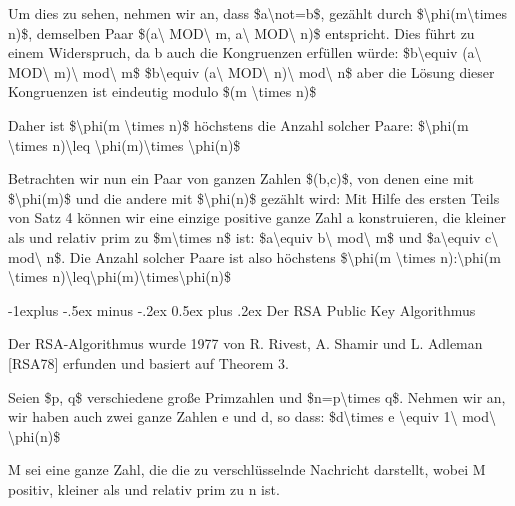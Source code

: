 \documentclass[a4paper]{article}
\makeatletter
\renewcommand{\subsection}{\@startsection{subsection}{2}{0mm}%
 {-1explus -.5ex minus -.2ex}%
 {0.5ex plus .2ex}%
 {\normalfont\normalsize\bfseries}}
\makeatother
\begin{document}
\begin{multicols}{3}
\begin{itemize*}
\begin{itemize*}
\begin{itemize*}
                        \begin{itemize*} \item Um dies zu sehen, nehmen wir an, dass \$a\textbackslash not=b\$, gezählt durch \$\textbackslash phi(m\textbackslash times n)\$, demselben Paar \$(a\textbackslash{} MOD\textbackslash{} m, a\textbackslash{} MOD\textbackslash{} n)\$ entspricht. Dies führt zu einem Widerspruch, da b auch die Kongruenzen erfüllen würde: \$b\textbackslash equiv (a\textbackslash{} MOD\textbackslash{} m)\textbackslash{} mod\textbackslash{} m\$ \$b\textbackslash equiv (a\textbackslash{} MOD\textbackslash{} n)\textbackslash{} mod\textbackslash{} n\$ aber die Lösung dieser Kongruenzen ist eindeutig modulo \$(m \textbackslash times n)\$ \item Daher ist \$\textbackslash phi(m \textbackslash times n)\$ höchstens die Anzahl solcher Paare: \$\textbackslash phi(m \textbackslash times n)\textbackslash leq \textbackslash phi(m)\textbackslash times \textbackslash phi(n)\$ \end{itemize*} \item Betrachten wir nun ein Paar von ganzen Zahlen \$(b,c)\$, von denen eine mit \$\textbackslash phi(m)\$ und die andere mit \$\textbackslash phi(n)\$ gezählt wird: Mit Hilfe des ersten Teils von Satz 4 können wir eine einzige positive ganze Zahl a konstruieren, die kleiner als und relativ prim zu \$m\textbackslash times n\$ ist: \$a\textbackslash equiv b\textbackslash{} mod\textbackslash{} m\$ und \$a\textbackslash equiv c\textbackslash{} mod\textbackslash{} n\$. Die Anzahl solcher Paare ist also höchstens \$\textbackslash phi(m \textbackslash times n):\textbackslash phi(m \textbackslash times n)\textbackslash leq\textbackslash phi(m)\textbackslash times\textbackslash phi(n)\$ \end{itemize*}
            \end{itemize*}
      \end{itemize*}


      \subsection{Der RSA Public Key
            Algorithmus}

      \begin{itemize*}
            \item
            Der RSA-Algorithmus wurde 1977 von R. Rivest, A. Shamir und L. Adleman
            {[}RSA78{]} erfunden und basiert auf Theorem 3.
            \item
            Seien \$p, q\$ verschiedene große Primzahlen und
            \$n=p\textbackslash times q\$. Nehmen wir an, wir haben auch zwei
            ganze Zahlen e und d, so dass: \$d\textbackslash times e
            \textbackslash equiv 1\textbackslash{} mod\textbackslash{}
            \textbackslash phi(n)\$
            \item
            M sei eine ganze Zahl, die die zu verschlüsselnde Nachricht darstellt,
            wobei M positiv, kleiner als und relativ prim zu n ist.


\end{itemize*}
\end{multicols}
\end{document}

